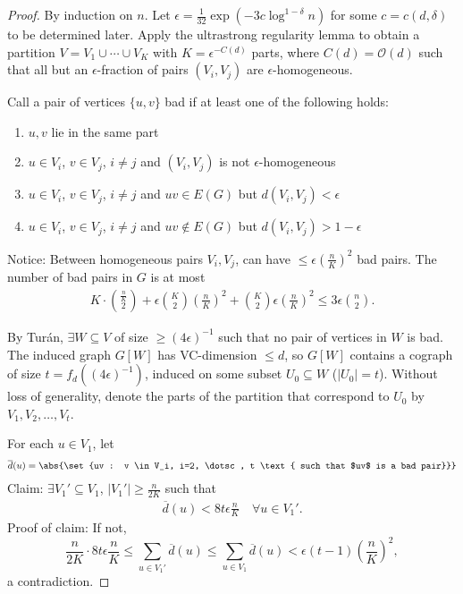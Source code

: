 \documentclass{article}
\begin{document}
\begin{proof}
  By induction on $n$.
  Let $\epsilon = \frac{1}{32} \exp(-3c \log^{1-\delta} n)$ for some $c = c(d,\delta)$ to be determined later.
  Apply the ultrastrong regularity lemma to obtain a partition $V = V_1 \cup \dotsb \cup V_K$ with $K = \epsilon^{-C(d)}$ parts, where $C(d) = \mathcal{O}(d)$ such that all but an $\epsilon$-fraction of pairs $(V_i, V_j)$ are $\epsilon$-homogeneous.

  Call a pair of vertices $\{u,v\}$ bad if at least one of the following holds:
  \begin{enumerate}
    \item $u,v$ lie in the same part
    \item $u \in V_i$, $v \in V_j$, $i \neq j$ and $(V_i, V_j)$ is not $\epsilon$-homogeneous
    \item $u \in V_i$, $v \in V_j$, $i \neq j$ and $uv \in E(G)$ but $d(V_i,V_j) < \epsilon$
    \item $u \in V_i$, $v \in V_j$, $i \neq j$ and $uv \notin E(G)$ but $d(V_i,V_j) > 1- \epsilon$
  \end{enumerate}
  Notice: Between homogeneous pairs $V_i,V_j$, can have $\leq \epsilon (\frac{n}{K})^2$ bad pairs.
  The number of bad pairs in $G$ is at most
  \begin{align*}
    K \cdot \binom{\frac{n}{K}}{2} + \epsilon \binom{K}{2} \left(\frac{n}{K}\right)^2 + \binom{K}{2} \epsilon \left(\frac{n}{K}\right)^2 \leq 3 \epsilon \binom{n}{2}.
  \end{align*}

  By Tur\'an, $\exists W \subseteq V$ of size $\geq (4\epsilon)^{-1}$ such that no pair of vertices in $W$ is bad.
  The induced graph $G[W]$ has VC-dimension $\leq d$, so $G[W]$ contains a cograph of size $t = f_d((4\epsilon)^{-1})$, induced on some subset $U_0 \subseteq W$ ($|U_0|=t$).
  Without loss of generality, denote the parts of the partition that correspond to $U_0$ by $V_1, V_2, \dotsc, V_t$.

  For each $u \in V_1$, let
  \begin{align*}
    \overline{d}(u) = \abs{\set{uv : v \in V_i, i=2, \dotsc, t \text{ such that $uv$ is a bad pair}}}
  \end{align*}
  Claim: $\exists V_1' \subseteq V_1$, $|V_1'| \geq \frac{n}{2K}$ such that
  \begin{align*}
    \overline{d}(u) < 8 t \epsilon \frac{n}{K} \quad \forall u \in V_1'.
  \end{align*}
  Proof of claim:
  If not,
  \begin{equation*}
    \frac{n}{2K} \cdot 8 t \epsilon \frac{n}{K} \leq \sum_{u \in V_1'} \overline{d}(u) \leq \sum_{u \in V_1} \overline{d}(u) < \epsilon (t-1) \left(\frac{n}{K}\right)^2,
  \end{equation*}
  a contradiction.


\end{proof}
\end{document}
